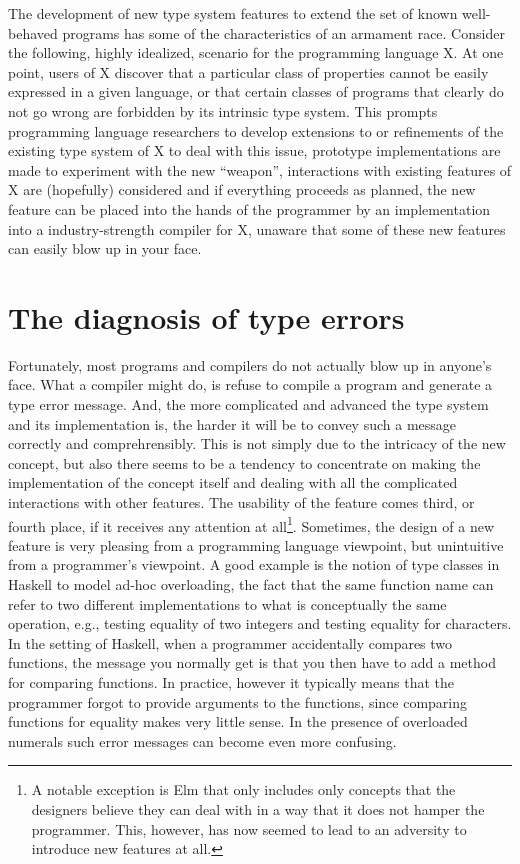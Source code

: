 \documentclass[sigplan,10pt,noacm]{acmart}
\begin{document}
The development of new type system features to extend the set of known
well-behaved programs has some of the characteristics of an armament race.
Consider the following, highly idealized, scenario for the programming
language X.
At one point, users of X discover that a particular class of 
properties cannot be easily expressed in a given language, or that 
certain classes of programs that
clearly do not go wrong are forbidden by its intrinsic type system.
This prompts programming language researchers to develop extensions to or
refinements of the existing type system of X to deal with this issue,
prototype implementations are made to experiment with the new ``weapon'',
interactions with existing features of X are (hopefully) considered and
if everything proceeds as planned, the new feature can be placed into the
hands of the programmer by an implementation into a industry-strength compiler
for X, unaware that some of these new features can easily blow up in 
your face.

\section{The diagnosis of type errors}

Fortunately, most programs and compilers do not actually blow up in anyone's 
face. What a compiler might do, is refuse to compile a program and generate a 
type error
message. And, the more complicated and advanced the type system and its
implementation is, the harder it will be to convey such a message
correctly and comprehrensibly. This is not simply due to 
the intricacy of the new concept, but also there seems to be a tendency
to concentrate on making the implementation of the concept itself
and dealing with all the complicated interactions with other features.
The usability of the feature comes third, or fourth place, if it
receives any attention at all\footnote{A notable exception is Elm that only
includes only concepts that the designers believe they can deal with in a way that 
it does not hamper the programmer. This, however, has now seemed to lead to 
an adversity to introduce new features at all.}. Sometimes, the design
of a new feature is very pleasing from a programming language viewpoint, but
unintuitive from a programmer's viewpoint. A good example is the notion of
type classes in Haskell to model ad-hoc overloading, the fact that the
same function name can refer to two different implementations to what
is conceptually the same operation, e.g., testing equality of two integers
and testing equality for characters. In the setting of Haskell, when 
a programmer accidentally compares two functions, the message you normally
get is that you then have to add a method for comparing functions. 
In practice, however it typically means that the programmer forgot to provide 
arguments to the functions, since comparing functions for equality makes
very little sense. In the presence of overloaded numerals such error messages 
can become even more confusing.
\end{document}
